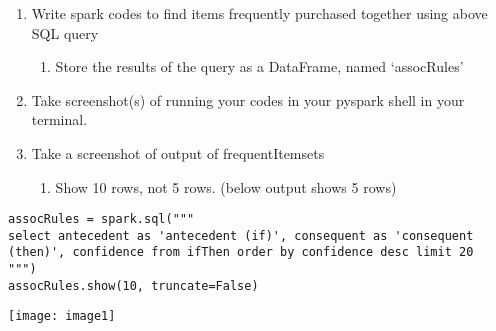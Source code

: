 \documentclass[]{article}
\begin{document}
\begin{enumerate}[before=\itshape,label=\arabic*.]
	\item Write spark codes to find items frequently purchased together using above SQL query
	\begin{enumerate}[before=\itshape,label=\alph*.]
		\item Store the results of the query as a DataFrame, named ‘assocRules’
	\end{enumerate}
	\item Take screenshot(s) of running your codes in your pyspark shell in your terminal.
	\item Take a screenshot of output of frequentItemsets
	\begin{enumerate}[before=\itshape,label=\alph*.]
		\item Show 10 rows, not 5 rows. (below output shows 5 rows)
	\end{enumerate}
\end{enumerate} 

\begin{verbatim}
assocRules = spark.sql("""
select antecedent as 'antecedent (if)', consequent as 'consequent (then)', confidence from ifThen order by confidence desc limit 20
""")
assocRules.show(10, truncate=False)
\end{verbatim}
\texttt{[image: image1]}
\end{document}
